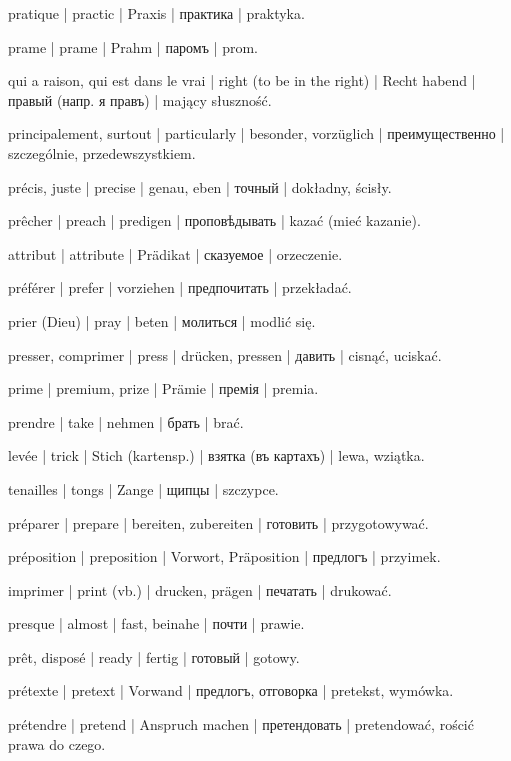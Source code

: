 \begin{outdent}{1em}
pratique | practic | Praxis | практика | praktyka.

prame | prame | Prahm | паромъ | prom.

qui a raison, qui est dans le vrai | right (to be in the
right) | Recht habend | правый (напр. я правъ) | mający słuszność.

principalement, surtout | particularly | besonder,
vorzüglich | преимущественно | szczególnie, przedewszystkiem.

précis, juste | precise | genau, eben | точный | dokładny,
ścisły.

prêcher | preach | predigen | проповѣдывать | kazać (mieć
kazanie).

attribut | attribute | Prädikat | сказуемое | orzeczenie.

préférer | prefer | vorziehen | предпочитать | przekładać.

prier (Dieu) | pray | beten | молиться | modlić się.

presser, comprimer | press | drücken, pressen | давить | cisnąć, uciskać.

prime | premium, prize | Prämie | премія | premia.

prendre | take | nehmen | брать | brać.

\uvsubentry{}
levée | trick | Stich (kartensp.) | взятка (въ картахъ) | lewa, wziątka.


\uvsubentry{}
tenailles | tongs | Zange | щипцы | szczypce.

préparer | prepare | bereiten, zubereiten | готовить | przygotowywać.

préposition | preposition | Vorwort, Präposition | предлогъ | przyimek.

imprimer | print (vb.) | drucken, prägen | печатать | drukować.

presque | almost | fast, beinahe | почти | prawie.

prêt, disposé | ready | fertig | готовый | gotowy.

prétexte | pretext | Vorwand | предлогъ, отговорка | pretekst, wymówka.

prétendre | pretend | Anspruch machen | претендовать | pretendować, rościć prawa do czego.


\end{outdent}
